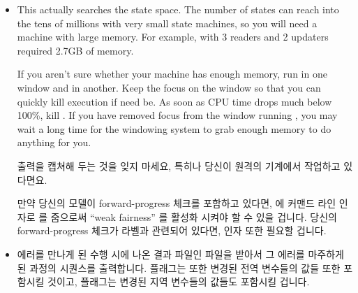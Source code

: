 \begin{itemize}
\item	{}
	This actually searches the state space.  The number of states
	can reach into the tens of millions with very small state
	machines, so you will need a machine with large memory.
	For example,  with 3 readers and 2 updaters required
	2.7GB of memory.

	If you aren't sure whether your machine has enough memory,
	run  in one window and  in another.  Keep the
	focus on the  window so that you can quickly kill
	execution if need be.  As soon as CPU time drops much below
	100\%, kill .  If you have removed focus from the
	window running , you may wait a long time for the
	windowing system to grab enough memory to do anything for
	you.
\fi

	출력을 캡쳐해 두는 것을 잊지 마세요, 특히나 당신이 원격의 기계에서
	작업하고 있다면요.

	만약 당신의 모델이 forward-progress 체크를 포함하고 있다면, 
	에 커맨드 라인 인자로  를 줌으로써 ``weak fairness'' 를 활성화
	시켜야 할 수 있을 겁니다.
	당신의 forward-progress 체크가  라벨과 관련되어 있다면,
	 인자 또한 필요할 겁니다.
\iffalse

	Don't forget to capture the output, especially
	if you are working on a remote machine.

	If your model includes forward-progress checks, you will likely
	need to enable ``weak fairness'' via the \co{-f} command-line
	argument to \co{./pan}.
	If your forward-progress checks involve \co{accept} labels,
	you will also need the \co{-a} argument.
\fi
\item	{}
	에러를 만나게 된 수행 시에 나온 결과 파일인  파일을 받아서 그
	에러를 마주하게 된 과정의 시퀀스를 출력합니다.
	 플래그는 또한 변경된 전역 변수들의 값들 또한 포함시킬 것이고,
	 플래그는 변경된 지역 변수들의 값들도 포함시킬 겁니다.
\iffalse

\item	\co{spin -t -p qrcu.spin}
	Given \co{trail} file output by a run that encountered an
	error, output the sequence of steps leading to that error.
	The \co{-g} flag will also include the values of changed
	global variables, and the  \co{-l} flag will also include
	the values of changed local variables.
\fi
\end{itemize}

